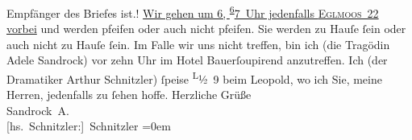 \begin{ledgroupsized}[t]{13cm}
{{{                     Empfänger des Briefes ist.}}}\label{K_L00364-33h}!\pend\pstart
           \uline{Wir gehen um }\uline{6}\uline{, }\substVorne{}\textsuperscript{\uline{6}}\substDazwischen{}\uline{7}\substHinten{}\uline{ Uhr}\uline{ jedenfalls \textsc{Eglmoos 22} vorbei} und werden pfeifen oder auch nicht pfeifen. Sie werden zu Hauſe
               ſein oder auch nicht zu Hauſe ſein. Im Falle wir uns nicht {\pb}treffen, bin ich (die Tragödin Adele Sandrock) vor
               zehn Uhr im Hotel Bauerſoupirend anzutreffen. Ich (der Dramatiker Arthur
               Schnitzler) ſpeise \substVorne{}\textsuperscript{L}\substDazwischen{}½ 9\substHinten{} beim Leopold, wo ich Sie, meine Herren,
               jedenfalls zu ſehen hoffe.\pend
           \pstart
           Herzliche Grüße{\\[\baselineskip]}\spacefill\mbox{Sandrock A.}{\\[\baselineskip]}\spacefill\mbox{{[}hs. Schnitzler:{]} Schnitzler}\pend
           \leftskip=0em{}
         
         \endnumbering{}\end{ledgroupsized}  \newcommand{\dateiname}{L00364}\newcommand{\titel}{Adele Sandrock und Arthur Schnitzler an Richard Beer-Hofmann, 29. 8. 1894}\newcommand{\editorInnen}{Martin Anton Müller und Gerd-Hermann Susen}
      